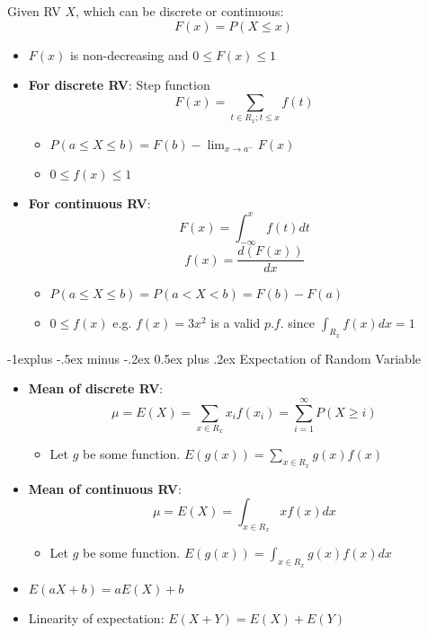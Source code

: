 \documentclass{article}
\makeatletter
\renewcommand{\subsection}{\@startsection{subsection}{2}{0mm}%
  {-1explus -.5ex minus -.2ex}%
  {0.5ex plus .2ex}%
{\normalfont\normalsize\bfseries}}
\makeatother
\begin{document}
\begin{multicols*}{3}
Given RV $X$, which can be discrete or continuous:
\[F(x) = P(X \leq x)\]

\begin{itemize}
    \item $F(x)$ is non-decreasing and $0 \leq F(x) \leq 1$
    \item \textbf{For discrete RV}: Step function
    \[F(x) = \sum _{t \in R_x; t \leq x} f(t)\]
    \begin{itemize}
        \item $P(a \leq X \leq b) = F(b) - \lim _{x \to a^-} F(x)$
        \item $0 \leq f(x) \leq 1$
    \end{itemize}

    \item \textbf{For continuous RV}:
    \[F(x) = \int _{-\infty} ^{x} f(t) dt\]
    \[f(x) = \frac{d(F(x))}{dx}\]
    \begin{itemize}
        \item $P(a \leq X \leq b) = P(a < X < b) = F(b) - F(a)$
        \item $0 \leq f(x)$ e.g. $f(x) = 3x^2$ is a valid $p.f.$ since $\int _{R_x} f(x) dx = 1$
    \end{itemize}
\end{itemize}

\subsection{Expectation of Random Variable}

\begin{itemize}
    \item \textbf{Mean of discrete RV}: 
    \[\mu = E(X) = \sum _{x \in R_x} x_i f(x_i) = \sum _{i=1} ^{\infty} P(X \geq i)\]
    \begin{itemize}
        \item Let $g$ be some function. $E(g(x)) = \sum _{x \in R_x} g(x)f(x)$
    \end{itemize}
    \item \textbf{Mean of continuous RV}: 
    \[\mu = E(X) = \int _{x \in R_x} x f(x) dx\]
    \begin{itemize}
        \item Let $g$ be some function. $E(g(x)) = \int _{x \in R_x} g(x)f(x)dx$
    \end{itemize}
    \item $E(aX + b) = aE(X) + b$
    \item Linearity of expectation: $E(X + Y) = E(X) + E(Y)$
\end{itemize}


\end{multicols*}
\end{document}

